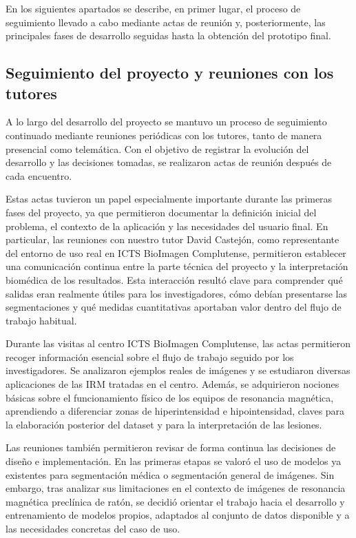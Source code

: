 En los siguientes apartados se describe, en primer lugar, el proceso de seguimiento llevado a cabo mediante actas de reunión y, posteriormente, las principales fases de desarrollo seguidas hasta la obtención del prototipo final.

\subsection{Seguimiento del proyecto y reuniones con los tutores}

A lo largo del desarrollo del proyecto se mantuvo un proceso de seguimiento continuado mediante reuniones periódicas con los tutores, tanto de manera presencial como telemática. Con el objetivo de registrar la evolución del desarrollo y las decisiones tomadas, se realizaron actas de reunión después de cada encuentro.

Estas actas tuvieron un papel especialmente importante durante las primeras fases del proyecto, ya que permitieron documentar la definición inicial del problema, el contexto de la aplicación y las necesidades del usuario final. En particular, las reuniones con nuestro tutor David Castejón, como representante del entorno de uso real en ICTS BioImagen Complutense, permitieron establecer una comunicación continua entre la parte técnica del proyecto y la interpretación biomédica de los resultados. Esta interacción resultó clave para comprender qué salidas eran realmente útiles para los investigadores, cómo debían presentarse las segmentaciones y qué medidas cuantitativas aportaban valor dentro del flujo de trabajo habitual.

Durante las visitas al centro ICTS BioImagen Complutense, las actas permitieron recoger información esencial sobre el flujo de trabajo seguido por los investigadores. Se analizaron ejemplos reales de imágenes y se estudiaron diversas aplicaciones de las IRM tratadas en el centro. Además, se adquirieron nociones básicas sobre el funcionamiento físico de los equipos de resonancia magnética, aprendiendo a diferenciar zonas de hiperintensidad e hipointensidad, claves para la elaboración posterior del dataset y para la interpretación de las lesiones.

Las reuniones también permitieron revisar de forma continua las decisiones de diseño e implementación. En las primeras etapas se valoró el uso de modelos ya existentes para segmentación médica o segmentación general de imágenes. Sin embargo, tras analizar sus limitaciones en el contexto de imágenes de resonancia magnética preclínica de ratón, se decidió orientar el trabajo hacia el desarrollo y entrenamiento de modelos propios, adaptados al conjunto de datos disponible y a las necesidades concretas del caso de uso.

